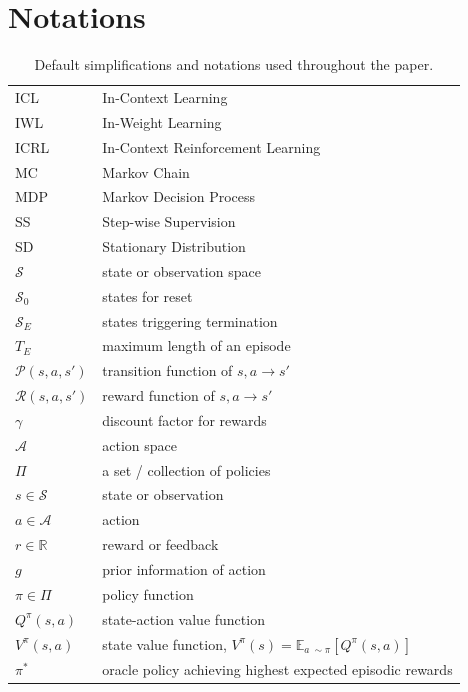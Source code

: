 \documentclass{article}
\begin{document}
\section{Notations}
\begin{table}[t]
\caption{Default simplifications and notations used throughout the paper.}
\label{table:notation}
\vskip 0.15in
\begin{center}
\begin{small}
\begin{sc}
\begin{tabular}{ll}
\toprule
ICL & In-Context Learning \\
IWL & In-Weight Learning \\
ICRL & In-Context Reinforcement Learning \\
MC & Markov Chain \\
MDP & Markov Decision Process \\
SS & Step-wise Supervision \\
SD & Stationary Distribution \\
\midrule
$\mathcal{S}$  & state or observation space \\
$\mathcal{S}_0$  & states for reset \\
$\mathcal{S}_E$ & states triggering termination \\
$T_E$ & maximum length of an episode \\
$\mathcal{P}(s,a,s')$ & transition function of $s, a \rightarrow s'$ \\
$\mathcal{R}(s,a,s')$ & reward function of $s, a \rightarrow s'$ \\
$\gamma$ & discount factor for rewards \\
$\mathcal{A}$  & action space \\
$\Pi$  & a set / collection of policies \\
$s \in \mathcal{S}$ & state or observation \\
$a \in \mathcal{A}$ & action \\
$r \in \mathbb{R}$ & reward or feedback \\
$g$ & prior information of action \\
$\pi \in \Pi$ & policy function \\
$Q^{\pi}(s,a)$ & state-action value function \\
$V^{\pi}(s,a)$ & state value function, $V^{\pi}(s) = \mathbb{E}_{a~\sim \pi}[Q^{\pi}(s, a)]$ \\
$\pi^*$ & oracle policy achieving highest expected episodic rewards \\

\end{tabular}
\end{sc}
\end{small}
\end{center}
\end{table}
\end{document}
